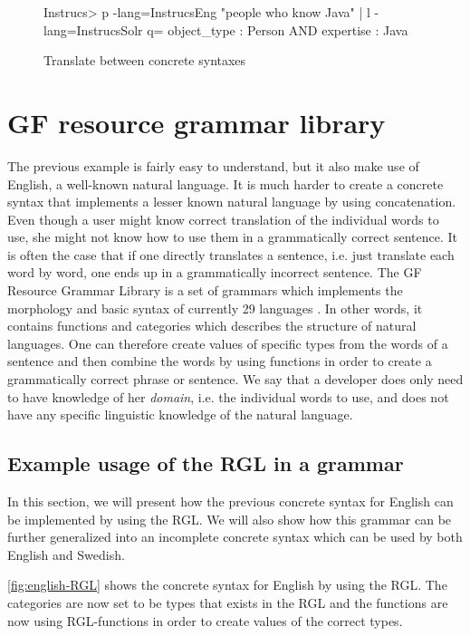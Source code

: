 \begin{figure}[H]
\begin{terminal}
Instrucs> p -lang=InstrucsEng "people who know Java" | l -lang=InstrucsSolr
q= object_type : Person AND expertise : Java
\end{terminal}
\caption{Translate between concrete syntaxes\label{fig:translation-concr}}
\end{figure}

\section{GF resource grammar library}

The previous example is fairly easy to understand, but it also make use of English, a well-known natural language. It is much harder to create a concrete syntax that implements a lesser known natural language by using concatenation. Even though a user might know correct translation of the individual words to use, she might not know how to use them in a grammatically correct sentence. It is often the case that if one directly translates a sentence, i.e. just translate each word by word, one ends up in a grammatically incorrect sentence.
\newline
\newline
The GF Resource Grammar Library \cite{gf-rgl} is a set of grammars which implements the morphology and basic syntax of currently 29 languages \cite{gf-rgl-synopsis}. In other words, it contains functions and categories which describes the structure of natural languages. One can therefore create values of specific types from the words of a sentence and then combine the words by using functions in order to create a grammatically correct phrase or sentence. We say that a developer does only need to have knowledge of her \emph{domain}, i.e. the individual words to use, and does not have any specific linguistic knowledge of the natural language.

\subsection*{Example usage of the RGL in a grammar}

In this section, we will present how the previous concrete syntax for English can be implemented by using the RGL. We will also show how this grammar can be further generalized into an incomplete concrete syntax which can be used by both English and Swedish.

\autoref{fig:english-RGL} shows the concrete syntax for English by using the RGL. The categories are now set to be types that exists in the RGL and the functions are now using RGL-functions in order to create values of the correct types.


